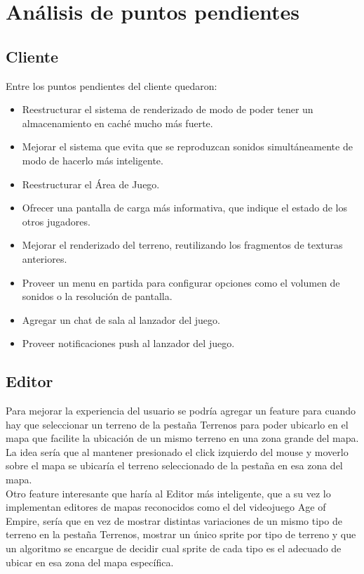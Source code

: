 \documentclass[titlepage,a4paper,12pt]{article}
\begin{document}
\section{Análisis de puntos pendientes}

\subsection{Cliente}
Entre los puntos pendientes del cliente quedaron: 
\begin{itemize}
\item Reestructurar el sistema de renderizado de modo de poder tener un almacenamiento en caché mucho más fuerte. 
\item Mejorar el sistema que evita que se reproduzcan sonidos simultáneamente de modo de hacerlo más inteligente.
\item Reestructurar el Área de Juego.
\item Ofrecer una pantalla de carga más informativa, que indique el estado de los otros jugadores.
\item Mejorar el renderizado del terreno, reutilizando los fragmentos de texturas anteriores.
\item Proveer un menu en partida para configurar opciones como el volumen de sonidos o la resolución de pantalla.
\item Agregar un chat de sala al lanzador del juego.
\item Proveer notificaciones push al lanzador del juego.
\end{itemize}

\subsection{Editor} 

Para mejorar la experiencia del usuario se podría agregar un feature para cuando hay que seleccionar un terreno de la pestaña Terrenos para poder ubicarlo en el mapa que facilite la ubicación de un mismo terreno en una zona grande del mapa. La idea sería que al mantener presionado el click izquierdo del mouse y moverlo sobre el mapa se ubicaría el terreno seleccionado de la pestaña en esa zona del mapa.\\

Otro feature interesante que haría al Editor más inteligente, que a su vez lo implementan editores de mapas reconocidos como el del videojuego Age of Empire, sería que en vez de mostrar distintas variaciones de un mismo tipo de terreno en la pestaña Terrenos, mostrar un único sprite por tipo de terreno y que un algoritmo se encargue de decidir cual sprite de cada tipo es el adecuado de ubicar en esa zona del mapa específica.  
\end{document}
